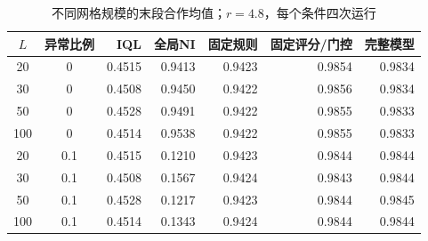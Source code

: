 \begin{table}[!htbp]
\centering\small
\caption{不同网格规模的末段合作均值；$r=4.8$，每个条件四次运行}
\label{tab:w2-scale}
\begin{tabular}{ccrrrrr}
\toprule
$L$ & 异常比例 & IQL & 全局NI & 固定规则 & 固定评分/门控 & 完整模型 \\
\midrule
20 & 0 & 0.4515 & 0.9413 & 0.9423 & 0.9854 & 0.9834 \\
30 & 0 & 0.4508 & 0.9450 & 0.9422 & 0.9856 & 0.9834 \\
50 & 0 & 0.4528 & 0.9491 & 0.9422 & 0.9855 & 0.9833 \\
100 & 0 & 0.4514 & 0.9538 & 0.9422 & 0.9855 & 0.9833 \\
20 & 0.1 & 0.4515 & 0.1210 & 0.9423 & 0.9844 & 0.9844 \\
30 & 0.1 & 0.4508 & 0.1567 & 0.9424 & 0.9843 & 0.9844 \\
50 & 0.1 & 0.4528 & 0.1217 & 0.9423 & 0.9844 & 0.9845 \\
100 & 0.1 & 0.4514 & 0.1343 & 0.9424 & 0.9844 & 0.9844 \\
\bottomrule
\end{tabular}
\par{}
\end{table}
